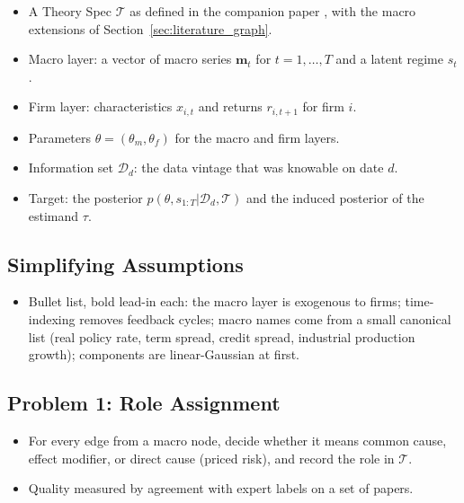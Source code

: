   \begin{itemize}
  \tightlist
  \item
    A Theory Spec \(\mathcal{T}\) as defined in the companion paper
    \cite{adia2026finance}, with the macro extensions of
    Section~\ref{sec:literature_graph}.
  \item
    Macro layer: a vector of macro series \(\mathbf{m}_t\) for
    \(t = 1, \dots, T\) and a latent regime \(s_t\).
  \item
    Firm layer: characteristics \(x_{i,t}\) and returns \(r_{i,t+1}\) for
    firm \(i\).
  \item
    Parameters \(\theta = (\theta_m, \theta_f)\) for the macro and firm
    layers.
  \item
    Information set \(\mathcal{D}_d\): the data vintage that was knowable
    on date \(d\).
  \item
    Target: the posterior \(p(\theta, s_{1:T} | \mathcal{D}_d,
    \mathcal{T})\) and the induced posterior of the estimand \(\tau\).
  \end{itemize}

  \subsection{Simplifying Assumptions}\label{sec:simplifying_assumptions}

  \begin{itemize}
  \tightlist
  \item
    Bullet list, bold lead-in each: the macro layer is exogenous to
    firms; time-indexing removes feedback cycles; macro names come from a
    small canonical list (real policy rate, term spread, credit spread,
    industrial production growth); components are linear-Gaussian at
    first.
  \end{itemize}

  \subsection{Problem 1: Role Assignment}\label{sec:problem_1_role_assignment}

  \begin{itemize}
  \tightlist
  \item
    For every edge from a macro node, decide whether it means common
    cause, effect modifier, or direct cause (priced risk), and record the
    role in \(\mathcal{T}\).
  \item
    Quality measured by agreement with expert labels on a set of papers.
  \end{itemize}

